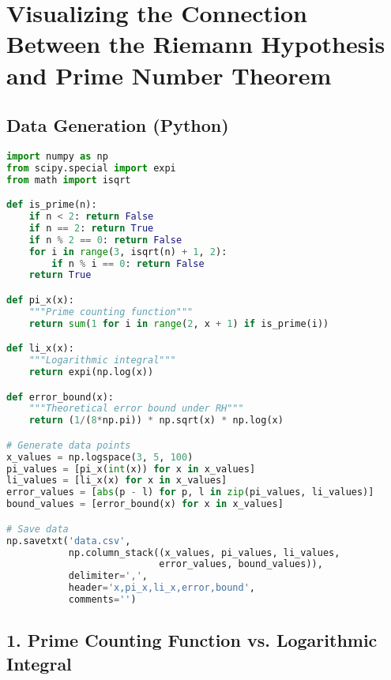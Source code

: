 \documentclass{article}
\begin{document}
\section*{Visualizing the Connection Between the Riemann Hypothesis and Prime Number Theorem}

\subsection*{Data Generation (Python)}

\begin{lstlisting}[language=Python]
import numpy as np
from scipy.special import expi
from math import isqrt

def is_prime(n):
    if n < 2: return False
    if n == 2: return True
    if n % 2 == 0: return False
    for i in range(3, isqrt(n) + 1, 2):
        if n % i == 0: return False
    return True

def pi_x(x):
    """Prime counting function"""
    return sum(1 for i in range(2, x + 1) if is_prime(i))

def li_x(x):
    """Logarithmic integral"""
    return expi(np.log(x))

def error_bound(x):
    """Theoretical error bound under RH"""
    return (1/(8*np.pi)) * np.sqrt(x) * np.log(x)

# Generate data points
x_values = np.logspace(3, 5, 100)
pi_values = [pi_x(int(x)) for x in x_values]
li_values = [li_x(x) for x in x_values]
error_values = [abs(p - l) for p, l in zip(pi_values, li_values)]
bound_values = [error_bound(x) for x in x_values]

# Save data
np.savetxt('data.csv', 
           np.column_stack((x_values, pi_values, li_values, 
                           error_values, bound_values)),
           delimiter=',', 
           header='x,pi_x,li_x,error,bound',
           comments='')
\end{lstlisting}

\subsection*{1. Prime Counting Function vs. Logarithmic Integral}

\begin{center}
\end{center}
\end{document}
